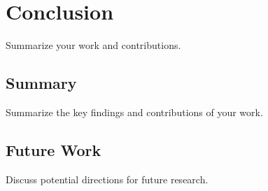 \section{Conclusion}
\label{sec:conclusion}

Summarize your work and contributions.

\subsection{Summary}
\label{subsec:summary}

Summarize the key findings and contributions of your work.


\subsection{Future Work}
\label{subsec:future}

Discuss potential directions for future research.

